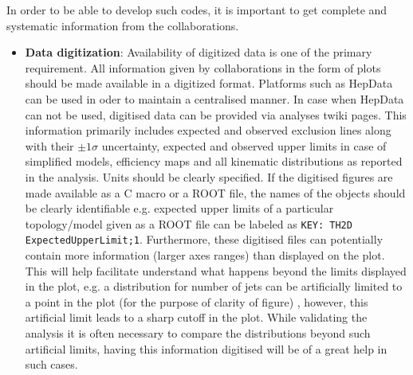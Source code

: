 In order to be able to develop such codes, it is important to get complete and systematic information from the collaborations. 
\begin{itemize}
	\item	\textbf{Data digitization}: Availability of digitized data is one of the primary requirement. All information given by collaborations in the form of plots should be made available in a digitized format. Platforms such as HepData can be used in oder to maintain a centralised manner. In case when HepData can not be used, digitised data can be provided via analyses twiki pages. This information primarily includes expected and observed exclusion lines along with their $\pm 1 \sigma$ uncertainty, expected and observed upper limits in case of simplified models, efficiency maps and all kinematic distributions as reported in the analysis. Units should be clearly specified. If the digitised figures are made available as a C macro or a ROOT file, the names of the objects should be clearly identifiable e.g. expected upper limits of a particular topology/model given  as a ROOT file can be labeled as \texttt{KEY: TH2D	ExpectedUpperLimit;1}. Furthermore, these digitised files can potentially contain more information (larger axes ranges) than displayed on the plot. This will help facilitate understand what happens beyond the limits displayed in the plot, e.g. a distribution for number of jets can be artificially limited to a point in the plot (for the purpose of clarity of figure) , however, this artificial limit leads to a sharp cutoff in the plot. While validating the analysis it is often necessary to compare the distributions beyond such artificial limits, having this information digitised will be of a great help in such cases. 
\end{itemize}

